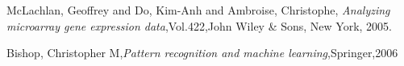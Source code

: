 \documentclass[letterpaper,12pt]{article}
\numberwithin{equation}{section}
\begin{document}

\begin{thebibliography}{99}

McLachlan, Geoffrey and Do, Kim-Anh and Ambroise, Christophe, \textit{Analyzing microarray gene expression data},Vol.422,John Wiley \& Sons, New York, 2005.

Bishop, Christopher M,\textit{Pattern recognition and machine learning},Springer,2006



\end{thebibliography}
\end{document}
